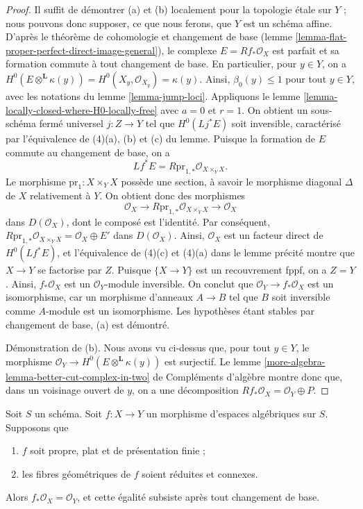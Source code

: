 \begin{proof}
Il suffit de d\'emontrer (a) et (b) localement pour la topologie \'etale sur
$Y$ ; nous pouvons donc supposer, ce que nous ferons, que $Y$ est un sch\'ema
affine. D'apr\`es le th\'eor\`eme de cohomologie et changement de base
(lemme \ref{lemma-flat-proper-perfect-direct-image-general}), le complexe
$E=Rf_*\mathcal{O}_X$ est parfait et sa formation commute \`a tout changement
de base. En particulier, pour $y\in Y$, on a
$H^0(E\otimes^\mathbf{L}\kappa(y))=
H^0(X_y,\mathcal{O}_{X_y})=\kappa(y)$.
Ainsi, $\beta_0(y)\leq1$ pour tout $y\in Y$, avec les notations du lemme
\ref{lemma-jump-loci}. Appliquons le lemme
\ref{lemma-locally-closed-where-H0-locally-free} avec $a=0$ et $r=1$.
On obtient un sous-sch\'ema ferm\'e universel $j:Z\to Y$ tel que
$H^0(Lj^*E)$ soit inversible, caract\'eris\'e par l'\'equivalence de (4)(a),
(b) et (c) du lemme. Puisque la formation de $E$ commute au changement de
base, on a
$$
Lf^*E = R\text{pr}_{1, *}\mathcal{O}_{X \times_Y X}.
$$
Le morphisme $\text{pr}_1:X\times_YX$ poss\`ede une section, \`a savoir le
morphisme diagonal $\Delta$ de $X$ relativement à $Y$. On obtient donc des morphismes
$$
\mathcal{O}_X \longrightarrow R\text{pr}_{1, *}\mathcal{O}_{X \times_Y X}
\longrightarrow \mathcal{O}_X
$$
dans $D(\mathcal{O}_X)$, dont le compos\'e est l'identit\'e. Par cons\'equent,
$R\text{pr}_{1,*}\mathcal{O}_{X\times_YX}=\mathcal{O}_X\oplus E'$ dans
$D(\mathcal{O}_X)$. Ainsi, $\mathcal{O}_X$ est un facteur direct de
$H^0(Lf^*E)$, et l'\'equivalence de (4)(c) et (4)(a) dans le lemme pr\'ecit\'e
montre que $X\to Y$ se factorise par $Z$. Puisque $\{X\to Y\}$ est un
recouvrement fppf, on a $Z=Y$. Ainsi, $f_*\mathcal{O}_X$ est un
$\mathcal{O}_Y$-module inversible. On conclut que
$\mathcal{O}_Y\to f_*\mathcal{O}_X$ est un isomorphisme, car un morphisme
d'anneaux $A\to B$ tel que $B$ soit inversible comme $A$-module est un
isomorphisme. Les hypoth\`eses \'etant stables par changement de base, (a) est
d\'emontr\'e.

\medskip\noindent
D\'emonstration de (b). Nous avons vu ci-dessus que, pour tout $y\in Y$, le
morphisme $\mathcal{O}_Y\to H^0(E\otimes^\mathbf{L}\kappa(y))$ est surjectif.
Le lemme \ref{more-algebra-lemma-better-cut-complex-in-two} de Compl\'ements
d'alg\`ebre montre donc que, dans un voisinage ouvert de $y$, on a une
d\'ecomposition $Rf_*\mathcal{O}_X=\mathcal{O}_Y\oplus P$.
\end{proof}

\begin{lemma}
\label{lemma-proper-flat-geom-red-connected}
Soit $S$ un sch\'ema.
Soit $f:X\to Y$ un morphisme d'espaces alg\'ebriques sur $S$. Supposons que
\begin{enumerate}
\item $f$ soit propre, plat et de pr\'esentation finie ;
\item les fibres g\'eom\'etriques de $f$ soient r\'eduites et connexes.
\end{enumerate}
Alors $f_*\mathcal{O}_X=\mathcal{O}_Y$, et cette \'egalit\'e subsiste apr\`es
tout changement de base.
\end{lemma}

